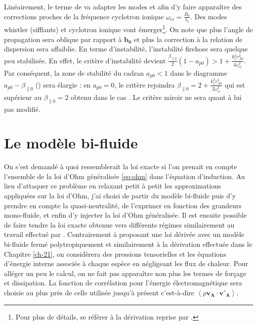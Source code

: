  Linéairement, le terme de  va adapter les modes  et  afin d'y faire apparaître des corrections proches de la fréquence cyclotron ionique $\omega_{ci} = \frac{B_0}{\lambda_i}$. Des modes \og whistler \fg{} (sifflants) et cyclotron ionique vont émerger\footnote{Pour plus de détails, se référer à la dérivation reprise par \cite{hunana_introductory_2019}.}. On note que plus l'angle de propagation sera oblique par rapport à $\boldsymbol{b_0}$ et plus la correction  à la relation de dispersion sera affaiblie. En terme d'instabilité, l'instabilité firehose sera quelque peu stabilisée. En effet, le critère d'instabilité devient $\frac{\beta_{\parallel 0}}{2}(1- a_{p0} ) > 1+\frac{k_{\parallel}^2 v^2_{A0}}{4\omega^2_{ci}}$. Par conséquent, la zone de stabilité du cadran $a_{p0}<1$ dans le diagramme $a_{p0}-\beta_{\parallel0}$ () sera élargie : en $a_{p0}=0$, le critère rejoindra $\beta_{\parallel 0} = 2+\frac{k_{\parallel}^2 v^2_{A0}}{2\omega^2_{ci}}$ qui est supérieur au $\beta_{\parallel 0} = 2$ obtenu dans le cas . Le critère miroir ne sera quant à lui pas modifié. 

\section{Le modèle bi-fluide}
\label{sec-233}

 On s'est demandé à quoi ressemblerait la loi exacte si l'on prenait en compte l'ensemble de la loi d'Ohm généralisée \eqref{eq:ohm} dans l'équation d'induction. Au lieu d'attaquer ce problème en relaxant petit à petit les approximations appliquées sur la loi d'Ohm, j'ai choisi de partir du modèle bi-fluide puis d'y prendre en compte la quasi-neutralité, de l'exprimer en fonction des grandeurs mono-fluide, et enfin d'y injecter la loi d'Ohm généralisée. Il est ensuite possible de faire tendre la loi exacte obtenue vers différents régimes similairement au travail effectué par \cite{banerjee_scale--scale_2020}. Contrairement à \cite{banerjee_scale--scale_2020} proposant une loi dérivée avec un modèle bi-fluide fermé polytropiquement et similairement à la dérivation effectuée dans le Chapitre \ref{ch-21}, on considèrera des pressions tensorielles et les équations d'énergie interne associée à chaque espèce en négligeant les flux de chaleur. Pour alléger un peu le calcul, on ne fait pas apparaître non plus les termes de forçage et dissipation.
 La fonction de corrélation pour l'énergie électromagnétique sera choisie au plus près de celle utilisée jusqu'à présent c'est-à-dire $\left<\rho \boldsymbol{v_A}\cdot \boldsymbol{v'_A}\right>$.
 
